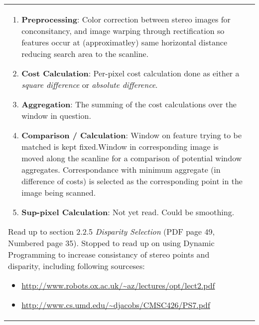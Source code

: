 \documentclass[a4paper,10pt]{article}
\begin{document}
\begin{longtable}{l p{12cm} }
{\par\begin{enumerate}
\item \textbf{Preprocessing}: Color correction between stereo images for conconsitancy, and image warping through rectification so features occur at (approximatley) same horizontal distance reducing search area to the scanline.
\item \textbf{Cost Calculation}: Per-pixel cost calculation done as either a \textit{square difference} or \textit{absolute difference}.
\item \textbf{Aggregation}: The summing of the cost calculations over the window in question.
\item \textbf{Comparison / Calculation}: Window on feature trying to be matched is kept fixed.Window in corresponding image  is moved along the scanline for a comparison of potential window aggregates. Correspondance with minimum aggregate (in difference of costs) is selected as the corresponding point in the image being scanned.
\item \textbf{Sup-pixel Calculation}: Not yet read. Could be smoothing.\newline
\end{enumerate}
\par Read up to section 2.2.5 \textit{Disparity Selection} (PDF page 49, Numbered page 35). Stopped to read up on using Dynamic Programming to increase consistancy of stereo points and disparity, including following sourceses:\newline
\par\begin{itemize}
\item \url{http://www.robots.ox.ac.uk/~az/lectures/opt/lect2.pdf}
\item \url{http://www.cs.umd.edu/~djacobs/CMSC426/PS7.pdf}
\end{itemize}

}
\end{longtable}
\end{document}
